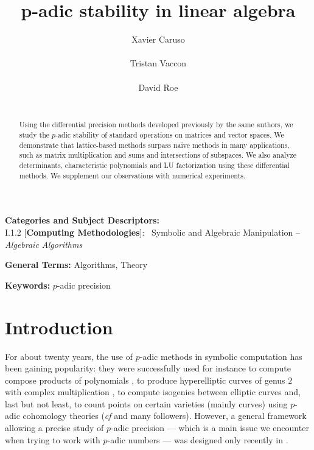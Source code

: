 \documentclass{sig-alternate}
\begin{document}
\title{p-adic stability in linear algebra}

\author{
\alignauthor Xavier Caruso\\
  \\
\alignauthor Tristan Vaccon\\
  \\
\alignauthor David Roe \\
  \\
}

\maketitle

\begin{abstract}
Using the differential precision methods developed previously by the same authors,
we study the $p$-adic stability of standard operations on matrices and vector 
spaces. We demonstrate that lattice-based methods surpass naive methods in many
applications, such as matrix multiplication and sums and intersections of subspaces.
We also analyze determinants, characteristic polynomials and LU factorization using these differential methods.
We supplement our observations with numerical experiments.
\end{abstract}

\vspace{1mm}
 \noindent
 {\bf Categories and Subject Descriptors:} \\
\noindent I.1.2 [{\bf Computing Methodologies}]:{~} Symbolic and Algebraic
  Manipulation -- \emph{Algebraic Algorithms}

 \vspace{1mm}
 \noindent
 {\bf General Terms:} Algorithms, Theory

 \vspace{1mm}
 \noindent
 {\bf Keywords:} $p$-adic precision
\medskip

\section{Introduction}

For about twenty years, the use of $p$-adic methods in symbolic 
computation has been gaining popularity: they were successfully 
used for instance 
to compute compose products of polynomials 
\cite{boston-gonzalez-perdry-schost:05a}, 
to produce hyperelliptic curves of genus $2$ with complex multiplication 
\cite{gaudry-houtmann-weng-ritzenthaler-kohel:06a},
to compute isogenies between elliptic curves \cite{lercier-sirvent:08a} 
and, last but not least,
to count points on certain varieties (mainly curves) using $p$-adic 
cohomology theories (\emph{cf} \cite{kedlaya:01a,lauder:04a} and many
followers).
However, a general framework allowing a precise study of $p$-adic 
precision --- which is a main issue we encounter when trying to work 
with $p$-adic numbers --- was designed only recently in 
\cite{caruso-roe-vaccon:14a}. 
\end{document}
